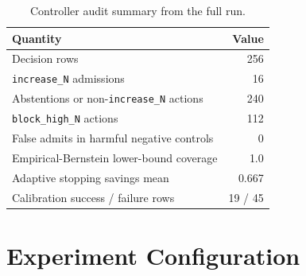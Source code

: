 \begin{table}[H]
\caption{Controller audit summary from the full run.}
\label{tab:controller-full}
\centering
\small
\begin{tabular}{lr}
\toprule
Quantity & Value \\
\midrule
Decision rows & 256 \\
\texttt{increase\_N} admissions & 16 \\
Abstentions or non-\texttt{increase\_N} actions & 240 \\
\texttt{block\_high\_N} actions & 112 \\
False admits in harmful negative controls & 0 \\
Empirical-Bernstein lower-bound coverage & 1.0 \\
Adaptive stopping savings mean & 0.667 \\
Calibration success / failure rows & 19 / 45 \\
\bottomrule
\end{tabular}
\end{table}

\section{Experiment Configuration}
\label{app:configs}

